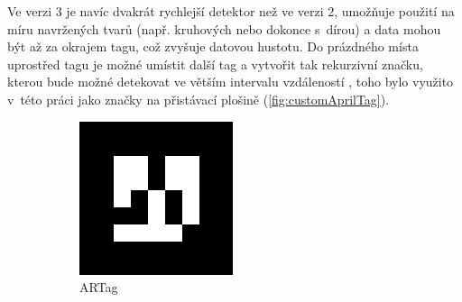       Ve verzi 3 je navíc dvakrát rychlejší detektor než ve verzi 2, umožňuje použití na míru navržených tvarů (např. kruhových nebo dokonce s~dírou) a data mohou být až za okrajem tagu, což zvyšuje datovou hustotu. Do prázdného místa uprostřed tagu je možné umístit další tag a vytvořit tak rekurzivní značku, kterou bude možné detekovat ve větším intervalu vzdáleností \cite{apriltag3}, toho bylo využito v~této práci jako značky na přistávací plošině (\cref{fig:customAprilTag}).

      \begin{figure}
        \centering
        \begin{subfigure}[t]{0.2\textwidth}
          \includegraphics[width=\textwidth]{img/targets/ARTag-8.png}
          \caption{ARTag}
          \label{fig:ARTag}
        \end{subfigure}
        \hfill
        \begin{subfigure}[t]{0.2\textwidth}

\end{subfigure}
\end{figure}

